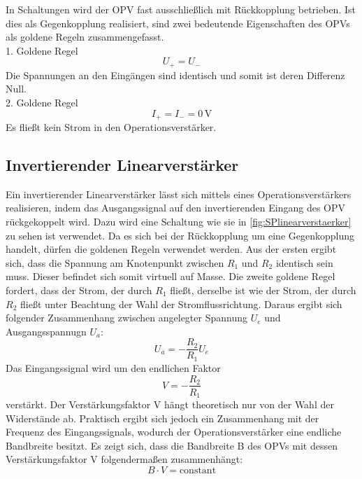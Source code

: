 In Schaltungen wird der OPV fast ausschließlich mit Rückkopplung betrieben.
Ist dies als Gegenkopplung realisiert, sind zwei bedeutende Eigenschaften des OPVs als goldene Regeln zusammengefasst.\\
1. Goldene Regel\\
\begin{equation} 
U_+ = U_- 
\end{equation} 
Die Spannungen an den Eingängen sind identisch und somit ist deren Differenz Null.\\
2. Goldene Regel\\
\begin{equation}
I_+ = I_- = 0\,\text{V}
\end{equation} 
Es fließt kein Strom in den Operationsverstärker.




\subsection{Invertierender Linearverstärker}\label{thlinearv}

Ein invertierender Linearverstärker lässt sich mittels eines Operationsverstärkers realisieren, indem das Ausgangssignal auf den invertierenden Eingang des OPV rückgekoppelt wird.
Dazu wird eine Schaltung wie sie in \autoref{fig:SPlinearverstaerker} zu sehen ist verwendet.
Da es sich bei der Rückkopplung um eine Gegenkopplung handelt, dürfen die goldenen Regeln verwendet werden.
Aus der ersten ergibt sich, dass die Spannung am Knotenpunkt zwischen $R_1$ und $R_2$ identisch sein muss. Dieser befindet sich somit virtuell auf Masse.
Die zweite goldene Regel fordert, dass der Strom, der durch $R_1$ fließt, derselbe ist wie der Strom, der durch $R_2$ fließt unter Beachtung der Wahl der Stromflussrichtung.
Daraus ergibt sich folgender Zusammenhang zwischen angelegter Spannung $U_e$ und Ausgangsspannugn $U_a$:
\begin{equation} 
U_a = -\frac{R_2}{R_1}U_e 
\end{equation} 
Das Eingangssignal wird um den endlichen Faktor
\begin{equation} 
V = -\frac{R_2}{R_1}
\end{equation}\label{eq:thverstarkung}
verstärkt. Der Verstärkungsfaktor V hängt theoretisch nur von der Wahl der Widerstände ab.
Praktisch ergibt sich jedoch ein Zusammenhang mit der Frequenz des Eingangssignals, wodurch der Operationsverstärker eine endliche Bandbreite besitzt.
Es zeigt sich, dass die Bandbreite B des OPVs mit dessen Verstärkungsfaktor V folgendermaßen zusammenhängt:
\begin{equation} 
B \cdot V = \text{constant}
\end{equation}



